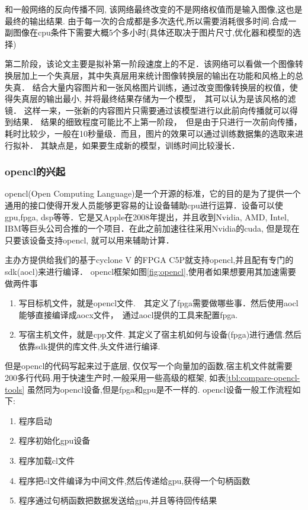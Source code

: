 和一般网络的反向传播不同, 该网络最终改变的不是网络权值而是输入图像,这也是最终的输出结果.
由于每一次的合成都是多次迭代,所以需要消耗很多时间.合成一副图像在cpu条件下需要大概5个多小时(具体还取决于图片尺寸,优化器和模型的选择)

第二阶段，该论文主要是拟补第一阶段速度上的不足．该网络可以看做一个图像转换层加上一个失真层，其中失真层用来统计图像转换层的输出在功能和风格上的总失真．
结合大量内容图片和一张风格图片训练，通过改变图像转换层的权值，使得失真层的输出最小, 并将最终结果存储为一个模型，　其可以认为是该风格的滤镜．
这样一来，一张新的内容图片只需要通过该模型进行以此前向传播就可以得到结果．
结果的细致程度可能比不上第一阶段，　但是由于只进行一次前向传播，耗时比较少，一般在10秒量级．而且，图片的效果可以通过训练数据集的选取来进行拟补．
其缺点是，如果要生成新的模型，训练时间比较漫长．

\subsubsection{opencl的兴起}
 opencl(Open Computing Language)是一个开源的标准，它的目的是为了提供一个通用的接口使得开发人员能够更容易的让设备辅助cpu进行运算．设备可以使gpu,fpga, dsp等等．它是又Apple在2008年提出，并且收到Nvidia, AMD, Intel, IBM等巨头公司合推的一个项目．在此之前加速往往采用Nvidia的cuda, 但是现在只要该设备支持opencl, 就可以用来辅助计算．

主办方提供给我们的基于cyclone V 的FPGA C5P就支持opencl,并且配有专门的sdk(aocl)来进行编译．
opencl框架如图\ref{fig:opencl},使用者如果想要用其加速需要做两件事
\begin{enumerate}
  \item 写目标机文件，就是opencl文件.　其定义了fpga需要做哪些事．然后使用aocl能够直接编译成aocx文件，　通过aocl提供的工具来配置fpga.
  \item 写宿主机文件，就是cpp文件. 其定义了宿主机如何与设备(fpga)进行通信.然后依靠sdk提供的库文件,头文件进行编译.
\end{enumerate}

但是opencl的代码写起来过于底层, 仅仅写一个向量加的函数,宿主机文件就需要200多行代码.用于快速生产时,一般采用一些高级的框架, 如表\ref{tbl:compare-opencl-tools}
虽然同为opencl设备,但是fpga和gpu是不一样的.
opencl设备一般工作流程如下:
\begin{enumerate}
  \item 程序启动
  \item 程序初始化gpu设备
  \item	程序加载cl文件
  \item	程序把cl文件编译为中间文件,然后传递给gpu,获得一个句柄函数
  \item 程序通过句柄函数把数据发送给gpu,并且等待回传结果
\end{enumerate}

